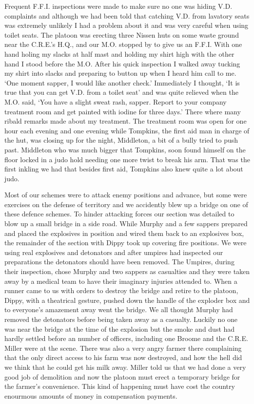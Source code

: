 Frequent F.F.I. inspections were made to make sure no one was hiding V.D.
complaints and although we had been told that catching V.D. from
lavatory seats was extremely unlikely I had a problem about it and was
very careful when using toilet seats. The platoon was erecting three
Nissen huts on some waste ground near the C.R.E.'s H.Q., and our M.O. stopped
by to give us an F.F.I. With one hand holing my slacks at half mast and
holding my shirt high with the other hand I stood before the M.O. After
his quick inspection I walked away tucking my shirt into slacks and
preparing to button up when I heard him call to me. `One moment
sapper, I would like another check.' Immediately I thought, `It is true
that you can get V.D. from a toilet seat' and was quite relieved when the
M.O. said, `You have a slight sweat rash, sapper. Report to your company
treatment room and get painted with iodine for three days.' There
where many ribald remarks made about my treatment. The treatment room
was open for one hour each evening and one evening while Tompkins, the
first aid man in charge of the hut, was closing up for the night,
\sapper Middleton, a bit of a bully tried to push past. Middleton who
was much bigger that Tompkins, soon found himself on the floor locked
in a judo hold needing one more twist to break his arm. That was the
first inkling we had that besides first aid, Tompkins also knew quite
a lot about judo.

Most of our schemes were to attack enemy positions and advance, but
some were exercises on the defense of territory and we accidently blew
up a bridge on one of these defence schemes. To hinder attacking
forces our section was detailed to blow up a small bridge in a side
road. While \corporal Murphy and a few sappers prepared and placed the
explosives in position and wired them back to an explosives box, the
remainder of the section with \lcorporal Dippy took up covering fire
positions. We were using real explosives and detonators and after
umpires had inspected our preparations the detonators should have been
removed. The Umpires, during their inspection, chose \corporal Murphy
and two sappers as casualties and they were taken away by a medical
team to have their imaginary injuries attended to. When a runner came
to us with orders to destroy the bridge and retire to the platoon,
Dippy, with a theatrical gesture, pushed down the handle of the
exploder box and to everyone's amazement away went the bridge. We all
thought Murphy had removed the detonators before being taken away as a
casualty. Luckily no one was near the bridge at the time of the
explosion but the smoke and dust had hardly settled before an number
of officers, including one \major Broome and the C.R.E. \lcolonel
Miller were at the scene. There was also a very angry farmer there
complaining that the only direct access to his farm was now destroyed,
and how the hell did we think that he could get his milk
away. \Lcolonel Miller told us that we had done a very good job of
demolition and now the platoon must erect a temporary bridge for the
farmer's convenience. This kind of happening must have cost the
country enourmous amounts of money in compensation payments.

